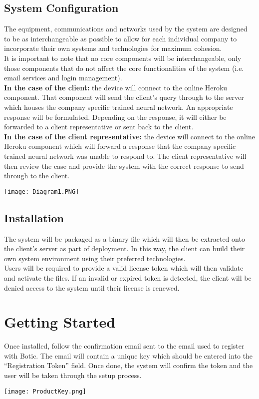 \documentclass[11pt]{article}
\begin{document}
\subsection{System Configuration}
\begin{flushleft}
	The equipment, communications and networks used by the system are designed to be as interchangeable as possible to allow for each individual company to incorporate their own systems and technologies for maximum cohesion.\\[0.5cm]
	It is important to note that no core components will be interchangeable, only those components that do not affect the core functionalities of the system (i.e. email services and login management).\\[0.5cm]
	\textbf{In the case of the client:} the device will connect to the online Heroku component. That component will send the client's query through to the server which houses the company specific trained neural network. An appropriate response will be formulated. Depending on the response, it will either be forwarded to a client representative or sent back to the client.\\[0.5cm]
	\textbf{In the case of the client representative:} the device will connect to the online Heroku component which will forward a response that the company specific trained neural network was unable to respond to. The client representative will then review the case and provide the system with the correct response to send through to the client.\\[0.5cm]
\end{flushleft}
\texttt{[image: Diagram1.PNG]}

\subsection{Installation}
\begin{flushleft}
	The system will be packaged as a binary file which will then be extracted onto the client's server as part of deployment. In this way, the client can build their own system environment using their preferred technologies.\\[0.5cm]
	Users will be required to provide a valid license token which will then validate and activate the files. If an invalid or expired token is detected, the client will be denied access to the system until their license is renewed.\\[0.5cm]
\end{flushleft}
\section {Getting Started}
\begin{flushleft}
	Once installed, follow the confirmation email sent to the email used to register with Botic. The email will contain a unique key which should be entered into the “Registration Token” field. Once done, the system will confirm the token and the user will be taken through the setup process.
\end{flushleft}
\texttt{[image: ProductKey.png]}
\end{document}
